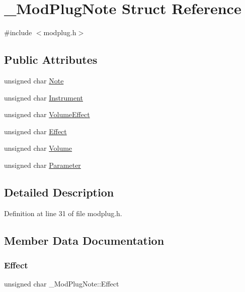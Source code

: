 \hypertarget{struct___mod_plug_note}{}\section{\+\_\+\+Mod\+Plug\+Note Struct Reference}
\label{struct___mod_plug_note}


{\ttfamily \#include $<$modplug.\+h$>$}

\subsection*{Public Attributes}
\begin{DoxyCompactItemize}
\item 
unsigned char \mbox{\hyperlink{struct___mod_plug_note_a9d5d83d9ebcfbe8f5af9508f01f9a0c1}{Note}}
\item 
unsigned char \mbox{\hyperlink{struct___mod_plug_note_a81617f5eafbddfd42b108f94ebb454c1}{Instrument}}
\item 
unsigned char \mbox{\hyperlink{struct___mod_plug_note_a059cfb2a3a219c45713a00d351b75813}{Volume\+Effect}}
\item 
unsigned char \mbox{\hyperlink{struct___mod_plug_note_a7453d151dce06c580eed11f7199161fd}{Effect}}
\item 
unsigned char \mbox{\hyperlink{struct___mod_plug_note_a2434d88ed6dadc634d8e594ffa915666}{Volume}}
\item 
unsigned char \mbox{\hyperlink{struct___mod_plug_note_ab00f709fda2b3d1fdd505bd3f9c3852c}{Parameter}}
\end{DoxyCompactItemize}


\subsection{Detailed Description}


Definition at line 31 of file modplug.\+h.



\subsection{Member Data Documentation}
\mbox{\label{struct___mod_plug_note_a7453d151dce06c580eed11f7199161fd}} 
\subsubsection{\texorpdfstring{Effect}{Effect}}
{\footnotesize\ttfamily unsigned char \+\_\+\+Mod\+Plug\+Note\+::\+Effect}



